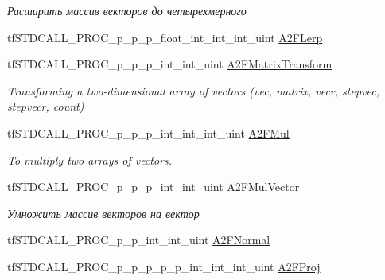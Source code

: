 \begin{DoxyCompactItemize}
\begin{DoxyCompactList}\small\item\em Расширить массив векторов до четырехмерного \end{DoxyCompactList}\item 
tf\-S\-T\-D\-C\-A\-L\-L\-\_\-\-P\-R\-O\-C\-\_\-p\-\_\-p\-\_\-p\-\_\-float\-\_\-int\-\_\-int\-\_\-int\-\_\-uint \hyperlink{structs_functions_array_vector_c_p_u_af33b00f249d9b16a3b75c2bd0854ffa7}{A2\-F\-Lerp}
\item 
\hypertarget{structs_functions_array_vector_c_p_u_a14e5899083e7ae927c650448728e2ddb}{tf\-S\-T\-D\-C\-A\-L\-L\-\_\-\-P\-R\-O\-C\-\_\-p\-\_\-p\-\_\-p\-\_\-int\-\_\-int\-\_\-uint \hyperlink{structs_functions_array_vector_c_p_u_a14e5899083e7ae927c650448728e2ddb}{A2\-F\-Matrix\-Transform}}\label{structs_functions_array_vector_c_p_u_a14e5899083e7ae927c650448728e2ddb}

\begin{DoxyCompactList}\small\item\em Transforming a two-\/dimensional array of vectors (vec, matrix, vecr, stepvec, stepvecr, count) \end{DoxyCompactList}\item 
\hypertarget{structs_functions_array_vector_c_p_u_a781399ae39c313b13ac3b19e835e5d02}{tf\-S\-T\-D\-C\-A\-L\-L\-\_\-\-P\-R\-O\-C\-\_\-p\-\_\-p\-\_\-p\-\_\-int\-\_\-int\-\_\-int\-\_\-uint \hyperlink{structs_functions_array_vector_c_p_u_a781399ae39c313b13ac3b19e835e5d02}{A2\-F\-Mul}}\label{structs_functions_array_vector_c_p_u_a781399ae39c313b13ac3b19e835e5d02}

\begin{DoxyCompactList}\small\item\em To multiply two arrays of vectors. \end{DoxyCompactList}\item 
\hypertarget{structs_functions_array_vector_c_p_u_aa8f3fe8842a20d42f0a7f8d28d3f264c}{tf\-S\-T\-D\-C\-A\-L\-L\-\_\-\-P\-R\-O\-C\-\_\-p\-\_\-p\-\_\-p\-\_\-int\-\_\-int\-\_\-uint \hyperlink{structs_functions_array_vector_c_p_u_aa8f3fe8842a20d42f0a7f8d28d3f264c}{A2\-F\-Mul\-Vector}}\label{structs_functions_array_vector_c_p_u_aa8f3fe8842a20d42f0a7f8d28d3f264c}

\begin{DoxyCompactList}\small\item\em Умножить массив векторов на вектор \end{DoxyCompactList}\item 
tf\-S\-T\-D\-C\-A\-L\-L\-\_\-\-P\-R\-O\-C\-\_\-p\-\_\-p\-\_\-int\-\_\-int\-\_\-uint \hyperlink{structs_functions_array_vector_c_p_u_a2ec3bd1fcfe3cc136276334fd38c421b}{A2\-F\-Normal}
\item 
\hypertarget{structs_functions_array_vector_c_p_u_a5f396f0ee33a78d262c2ff6e66164efb}{tf\-S\-T\-D\-C\-A\-L\-L\-\_\-\-P\-R\-O\-C\-\_\-p\-\_\-p\-\_\-p\-\_\-p\-\_\-p\-\_\-int\-\_\-int\-\_\-int\-\_\-uint \hyperlink{structs_functions_array_vector_c_p_u_a5f396f0ee33a78d262c2ff6e66164efb}{A2\-F\-Proj}}\label{structs_functions_array_vector_c_p_u_a5f396f0ee33a78d262c2ff6e66164efb}


\end{DoxyCompactItemize}
